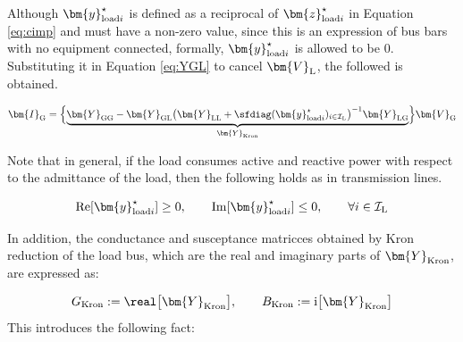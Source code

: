 \documentclass[graybox, envcountchap]{svmult}
\begin{document}
Although $\bm{y}_{{\rm load}i}^{\star}$ is defined as a reciprocal of
$\bm{z}_{{\rm load}i}^{\star}$ in Equation \ref{eq:cimp} and must have a
non-zero value, since this is an expression of bus bars with no equipment
connected, formally, $\bm{y}_{{\rm load}i}^{\star}$ is allowed to be 0.
Substituting it in Equation \ref{eq:YGL} to cancel $\bm{V}_{\rm L}$, the
followed is obtained.

\begin{equation}\label{eq:Kron}
  \bm{I}_{\rm G} = 
    \Bigl\{ 
      \underbrace{
        \bm{Y}_{\rm GG} - \bm{Y}_{\rm GL} 
        \bigl( \bm{Y}_{\rm LL} + \sfdiag(\bm{y}_{{\rm load}i}^{\star} )_{i \in \mathcal{I}_{\rm L}} \bigr)^{-1}
        \bm{Y}_{\rm LG} 
      }_{\bm{Y}_{\rm Kron}}
    \Bigr\}
  \bm{V}_{\rm G}
\end{equation}

Note that in general, if the load consumes active and reactive power with
respect to the admittance of the load, then the following holds as in
transmission lines.

\begin{equation}\label{eq:loadys}
  \operatorname{Re}[\bm{y}_{{\rm load}i}^{\star} ] \geq 0 ,\qquad
  \operatorname{Im}[\bm{y}_{{\rm load}i}^{\star} ] \leq 0
  ,\qquad
  \forall i \in \mathcal{I}_{\rm L}
\end{equation}

In addition, the conductance and susceptance matricces obtained by Kron
reduction of the load bus, which are the real and imaginary parts of
$\bm{Y}_{\rm Kron}$, are expressed as:

\[
  G_{\rm Kron} := \real \bigl[  \bm{Y}_{\rm Kron}  \bigr] ,\qquad
  B_{\rm Kron} := \imag \bigl[  \bm{Y}_{\rm Kron}  \bigr]
\]
This introduces the following fact:
\end{document}
